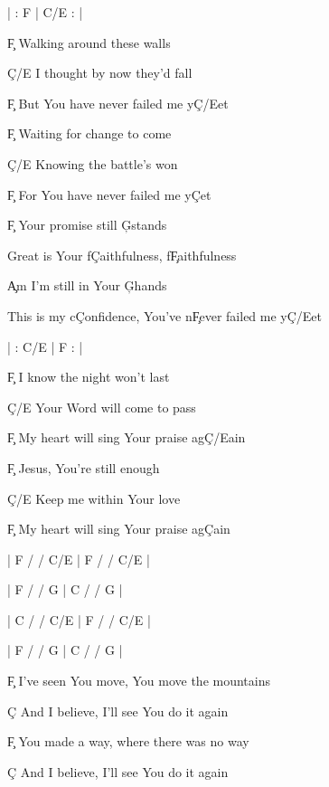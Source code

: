 \documentclass[9pt]{extarticle}
\begin{document}
\bsong

\bi
| : F |  C/E : |
\ei

\bv
\c{F} Walking around these walls

\c{C/E} I thought by now they'd fall

\c{F} But You have never failed me y\c{C/E}et



\c{F} Waiting for change to come

\c{C/E} Knowing the battle's won

\c{F} For You have never failed me y\c{C}et
\ev

\bc
\c{F} Your promise still \c{G}stands

Great is Your f\c{C}aithfulness, f\c{F}aithfulness

\c{Am} I'm still in Your \c{G}hands

This is my c\c{C}onfidence, You've n\c{F}ever failed me y\c{C/E}et
\ec

\bin
| : C/E  | F : |
\ein

\bv
\c{F} I know the night won't last

\c{C/E} Your Word will come to pass

\c{F} My heart will sing Your praise ag\c{C/E}ain



\c{F} Jesus, You're still enough

\c{C/E} Keep me within Your love

\c{F} My heart will sing Your praise ag\c{C}ain
\ev



\bin
|  F / / C/E  |  F / / C/E  |

|  F / / G  |  C / / G  |

|  C / / C/E  |  F / / C/E  |

|  F / / G  |  C / / G  |
\ein

\bb[2]
\c{F} I've seen You move, You move the mountains

\c{C} And I believe, I'll see You do it again

\c{F} You made a way, where there was no way

\c{C} And I believe, I'll see You do it again
\eb



\esong
\end{document}

